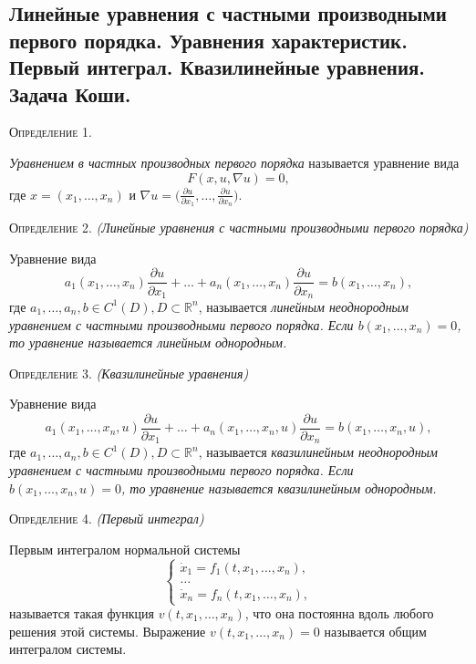 \subsection{Линейные уравнения с частными производными первого порядка. Уравнения характеристик. Первый интеграл. Квазилинейные уравнения. Задача Коши.}
\label{firstorder_lineq}

\textsc{Определение 1.}

\textit{Уравнением в частных производных первого порядка} называется уравнение вида
\begin{equation} \label{FOsimp}
	F(x, u, \nabla u) = 0,
\end{equation}
где $ x = (x_1, \dotsc, x_n) $ и $\nabla u = \Big(\frac{\partial u}{\partial x_1}, \dotsc, \frac{\partial u}{\partial x_n}\Big)$.

\textsc{Определение 2.} \textit{(Линейные уравнения с частными производными первого порядка)}

Уравнение вида 
\begin{equation}
	a_1(x_1, \dotsc, x_n) \frac{\partial u}{\partial x_1} + \dotsc + a_n(x_1, \dotsc, x_n) \frac{\partial u}{\partial x_n} = b(x_1, \dotsc, x_n),
\end{equation}
где $ a_1, \dotsc, a_n, b \in C^1(D), D \subset \mathbb{R}^{n}$, называется \textit{линейным неоднородным уравнением с частными производными первого порядка. Если $ b(x_1, \dotsc, x_n) = 0$, то уравнение называется линейным однородным.}


\textsc{Определение 3.} \textit{(Квазилинейные уравнения)}

Уравнение вида 
\begin{equation}
	a_1(x_1, \dotsc, x_n, u) \frac{\partial u}{\partial x_1} + \dotsc + a_n(x_1, \dotsc, x_n, u) \frac{\partial u}{\partial x_n} = b(x_1, \dotsc, x_n, u),
\end{equation}
где $ a_1, \dotsc, a_n, b \in C^1(D), D \subset \mathbb{R}^{n}$, называется \textit{квазилинейным неоднородным уравнением с частными производными первого порядка. Если $ b(x_1, \dotsc, x_n, u) = 0$, то уравнение называется квазилинейным однородным.} 

\textsc{Определение 4.} \textit{(Первый интеграл)}


Первым интегралом нормальной системы
\begin{equation} \label{norm_sys}
	\begin{cases}
		\dot{x}_1 = f_1(t, x_1, \dotsc, x_n), \\
		\dotsc \\
		\dot{x}_n = f_n(t, x_1, \dotsc, x_n),
	\end{cases}
\end{equation} 
называется такая функция $ v(t, x_1, \dotsc, x_n)$, что она постоянна вдоль любого решения этой системы. Выражение $ v(t, x_1, \dotsc, x_n) = 0$ называется общим интегралом системы. 


